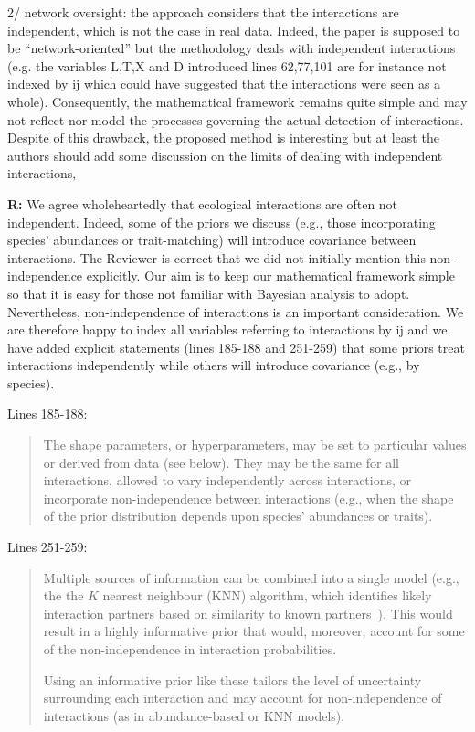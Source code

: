 \documentclass[12pt]{letter}
\newenvironment{refquote}{\bigskip \begin{it}}{\end{it}\smallskip}
\begin{document}
		\begin{refquote}
			2/ network oversight: the approach considers that the interactions are independent, which is not the case in real data. Indeed, the paper is supposed to be ``network-oriented'' but the methodology deals with independent interactions (e.g. the variables L,T,X and D introduced lines 62,77,101 are for instance not indexed by ij which could have suggested that the interactions were seen as a whole). Consequently, the mathematical framework remains quite simple and may not reflect nor model the processes governing the actual detection of interactions. Despite of this drawback, the proposed method is interesting but at least the authors should add some discussion on the limits of dealing with independent interactions,
		\end{refquote}


		\textbf{R:} We agree wholeheartedly that ecological interactions are often not independent. Indeed, some of the priors we discuss (e.g., those incorporating species' abundances or trait-matching) will introduce covariance between interactions. The Reviewer is correct that we did not initially mention this non-independence explicitly. Our aim is to keep our mathematical framework simple so that it is easy for those not familiar with Bayesian analysis to adopt. Nevertheless, non-independence of interactions is an important consideration. We are therefore happy to index all variables referring to interactions by ij and we have added explicit statements (lines 185-188 and 251-259) that some priors treat interactions independently while others will introduce covariance (e.g., by species). 


		Lines 185-188:


		\begin{quotation}
		    The shape parameters, or hyperparameters, may be set to particular values or derived from data (see below). They may be the same for all interactions, allowed to vary independently across interactions, or incorporate non-independence between interactions (e.g., when the shape of the prior distribution depends upon species' abundances or traits).
		\end{quotation}


		Lines 251-259:


		\begin{quotation}
			Multiple sources of information can be combined into a single model (e.g., the the $K$ nearest neighbour (KNN) algorithm, which identifies likely interaction partners based on similarity to known partners~\citep{DesjardinsProulx2017}). This would result in a highly informative prior that would, moreover, account for some of the non-independence in interaction probabilities. 


	        Using an informative prior like these tailors the level of uncertainty surrounding each interaction and may account for non-independence of interactions (as in abundance-based or KNN models).
	    \end{quotation}
\end{document}
